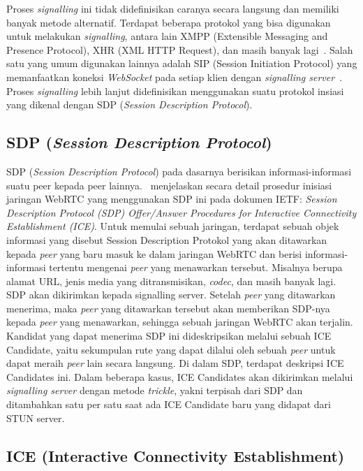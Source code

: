 Proses \textit{signalling} ini tidak didefinisikan caranya secara langsung dan memiliki banyak metode alternatif. Terdapat beberapa protokol yang bisa digunakan untuk melakukan \textit{signalling}, antara lain XMPP (Extensible Messaging and Presence Protocol), XHR (XML HTTP Request), dan masih banyak lagi~\citep{sredojev2015webrtc}. Salah satu yang umum digunakan lainnya adalah SIP (Session Initiation Protocol) yang memanfaatkan koneksi \textit{WebSocket} pada setiap klien dengan \textit{signalling server}~\citep{adeyeye2013determining}. Proses \textit{signalling} lebih lanjut didefinisikan menggunakan suatu protokol insiasi yang dikenal dengan SDP (\textit{Session Description Protocol}).

\subsection{SDP (\textit{Session Description Protocol})}
\label{subsec:sdp}

SDP (\textit{Session Description Protocol}) pada dasarnya berisikan informasi-informasi suatu peer kepada peer lainnya.~\cite{rfc8839} menjelaskan secara detail prosedur inisiasi jaringan WebRTC yang menggunakan SDP ini pada dokumen IETF: \textit{Session Description Protocol (SDP) Offer/Answer Procedures for Interactive Connectivity Establishment (ICE)}. Untuk memulai sebuah jaringan, terdapat sebuah objek informasi yang disebut Session Description Protokol yang akan ditawarkan kepada \textit{peer} yang baru masuk ke dalam jaringan WebRTC dan berisi informasi-informasi tertentu mengenai \textit{peer} yang menawarkan tersebut. Misalnya berupa alamat URL, jenis media yang ditransmisikan, \textit{codec}, dan masih banyak lagi. SDP akan dikirimkan kepada signalling server. Setelah \textit{peer} yang ditawarkan menerima, maka \textit{peer} yang ditawarkan tersebut akan memberikan SDP-nya kepada \textit{peer} yang menawarkan, sehingga sebuah jaringan WebRTC akan terjalin. Kandidat yang dapat menerima SDP ini dideskripsikan melalui sebuah ICE Candidate, yaitu sekumpulan rute yang dapat dilalui oleh sebuah \textit{peer} untuk dapat meraih \textit{peer} lain secara langsung. Di dalam SDP, terdapat deskripsi ICE Candidates ini. Dalam beberapa kasus, ICE Candidates akan dikirimkan melalui \textit{signalling server} dengan metode \textit{trickle}, yakni terpisah dari SDP dan ditambahkan satu per satu saat ada ICE Candidate baru yang didapat dari STUN server.

\subsection{ICE (Interactive Connectivity Establishment)}

